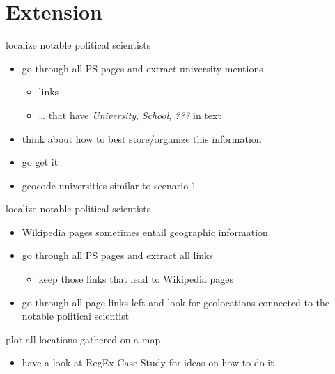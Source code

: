 \documentclass[ignorenonframetext,]{beamer}
\providecommand{\tightlist}{%
  \setlength{\itemsep}{0pt}\setlength{\parskip}{0pt}}
\begin{document}
\section{Extension}\label{extension}

\begin{frame}{localize notable political scientists}

\begin{itemize}
\tightlist
\item
  go through all PS pages and extract university mentions

  \begin{itemize}
  \tightlist
  \item
    links
  \item
    \ldots{} that have \emph{University}, \emph{School}, \emph{???} in
    text
  \end{itemize}
\item
  think about how to best store/organize this information
\item
  go get it
\item
  geocode universities similar to scenario 1
\end{itemize}

\end{frame}

\begin{frame}{localize notable political scientists}

\begin{itemize}
\tightlist
\item
  Wikipedia pages sometimes entail geographic information
\item
  go through all PS pages and extract all links

  \begin{itemize}
  \tightlist
  \item
    keep those links that lead to Wikipedia pages
  \end{itemize}
\item
  go through all page links left and look for geolocations connected to
  the notable political scientist
\end{itemize}

\end{frame}

\begin{frame}{plot all locations gathered on a map}

\begin{itemize}
\tightlist
\item
  have a look at RegEx-Case-Study for ideas on how to do it
\end{itemize}

\end{frame}
\end{document}

